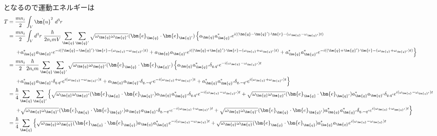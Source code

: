 \documentclass[dvipdfmx, 11pt, a4paper]{jsarticle}
\numberwithin{equation}{section}
\theoremstyle{definition}
\begin{document}
\begin{derivationBox}
\begin{align}
        \end{align}
        となるので運動エネルギーは
        \begin{align}
            T &= \frac{mn_i}{2}\int_V \dot{\bm{u}}^2\ d^3r \notag \\
            &= \frac{mn_i}{2}\int_V  d^3r\ \frac{\hbar}{2n_imV} \sum_{\bm{q}}\sum_{\bm{q}'} \sqrt{\omega_{\bm{q}}\omega_{\bm{q}'}} (\bm{e}_{\bm{q}}\cdot\bm{e}_{\bm{q}'})\left\{ a_{\bm{q}}a_{\bm{q}'}^* e^{i((\bm{q}-\bm{q}')\cdot\bm{r}-(\omega_{\bm{q}}-\omega_{\bm{q}'})t)}  \right. \notag \\
            &\ \ \ \ \left. +a_{\bm{q}}^*a_{\bm{q}'} e^{-i((\bm{q}-\bm{q}')\cdot\bm{r}-(\omega_{\bm{q}}-\omega_{\bm{q}'})t)} +a_{\bm{q}}a_{\bm{q}'} e^{i((\bm{q}+\bm{q}')\cdot\bm{r}-(\omega_{\bm{q}}+\omega_{\bm{q}'})t)} +a_{\bm{q}}^*a_{\bm{q}'}^* e^{-i((\bm{q}+\bm{q}')\cdot\bm{r}-(\omega_{\bm{q}}+\omega_{\bm{q}'})t)}  \right\} \notag \\
            &= \frac{mn_i}{2}\frac{\hbar}{2n_im} \sum_{\bm{q}}\sum_{\bm{q}'} \sqrt{\omega_{\bm{q}}\omega_{\bm{q}'}} (\bm{e}_{\bm{q}}\cdot\bm{e}_{\bm{q}'})\left\{ a_{\bm{q}}a_{\bm{q}'}^* \delta_{q,q'}e^{-i(\omega_{\bm{q}}-\omega_{\bm{q}'})t}  \right. \notag \\
            &\ \ \ \ \left. +a_{\bm{q}}^*a_{\bm{q}'} \delta_{q,q'}e^{i(\omega_{\bm{q}}-\omega_{\bm{q}'})t} +a_{\bm{q}}a_{\bm{q}'} \delta_{q,-q'}e^{-i(\omega_{\bm{q}}+\omega_{\bm{q}'})t} +a_{\bm{q}}^*a_{\bm{q}'}^*\delta_{q,-q'} e^{i(\omega_{\bm{q}}+\omega_{\bm{q}'})t}  \right\} \notag \\
            &= \frac{\hbar}{4} \sum_{\bm{q}}\sum_{\bm{q}'}  \left\{ \sqrt{\omega_{\bm{q}}\omega_{\bm{q}'}}(\bm{e}_{\bm{q}}\cdot\bm{e}_{\bm{q}'})a_{\bm{q}}a_{\bm{q}'}^* \delta_{q,q'}e^{-i(\omega_{\bm{q}}-\omega_{\bm{q}'})t} +\sqrt{\omega_{\bm{q}}\omega_{\bm{q}'}}(\bm{e}_{\bm{q}}\cdot\bm{e}_{\bm{q}'})a_{\bm{q}}^*a_{\bm{q}'} \delta_{q,q'}e^{i(\omega_{\bm{q}}-\omega_{\bm{q}'})t} \right. \notag \\
            &\ \ \ \ \left.  +\sqrt{\omega_{\bm{q}}\omega_{\bm{q}'}}(\bm{e}_{\bm{q}}\cdot\bm{e}_{\bm{q}'})a_{\bm{q}}a_{\bm{q}'} \delta_{q,-q'}e^{-i(\omega_{\bm{q}}+\omega_{\bm{q}'})t} +\sqrt{\omega_{\bm{q}}\omega_{\bm{q}'}}(\bm{e}_{\bm{q}}\cdot\bm{e}_{\bm{q}'})a_{\bm{q}}^*a_{\bm{q}'}^*\delta_{q,-q'} e^{i(\omega_{\bm{q}}+\omega_{\bm{q}'})t}  \right\} \notag \\
            &= \frac{\hbar}{4} \sum_{\bm{q}}  \left\{ \sqrt{\omega_{\bm{q}}\omega_{\bm{q}}}(\bm{e}_{\bm{q}}\cdot\bm{e}_{\bm{q}})a_{\bm{q}}a_{\bm{q}}^* e^{-i(\omega_{\bm{q}}-\omega_{\bm{q}})t} +\sqrt{\omega_{\bm{q}}\omega_{\bm{q}}}(\bm{e}_{\bm{q}}\cdot\bm{e}_{\bm{q}})a_{\bm{q}}^*a_{\bm{q}} e^{i(\omega_{\bm{q}}-\omega_{\bm{q}})t} \right. \notag \\

\end{align}
\end{derivationBox}
\end{document}
